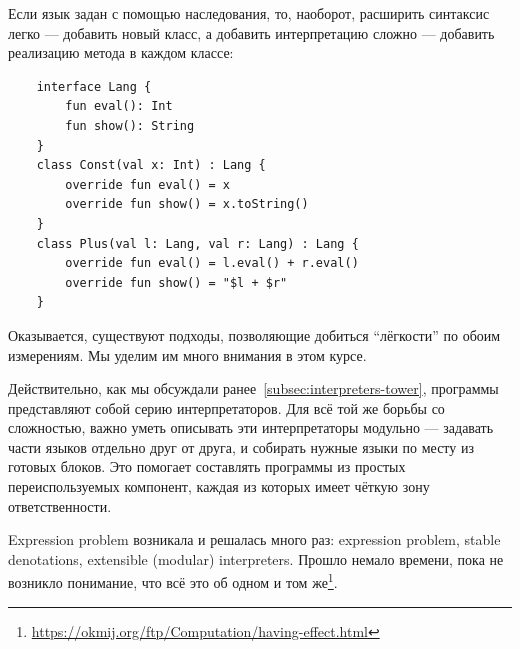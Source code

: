 Если язык задан с помощью наследования, то, наоборот, расширить синтаксис легко --- добавить новый класс, а добавить интерпретацию сложно --- добавить реализацию метода в каждом классе:
\begin{verbatim}
    interface Lang {
        fun eval(): Int
        fun show(): String
    }
    class Const(val x: Int) : Lang {
        override fun eval() = x
        override fun show() = x.toString()
    }
    class Plus(val l: Lang, val r: Lang) : Lang {
        override fun eval() = l.eval() + r.eval()
        override fun show() = "$l + $r"
    }
\end{verbatim}

Оказывается, существуют подходы, позволяющие добиться ``лёгкости'' по обоим измерениям.
Мы уделим им много внимания в этом курсе.

Действительно, как мы обсуждали ранее~\ref{subsec:interpreters-tower}, программы представляют собой серию интерпретаторов.
Для всё той же борьбы со сложностью, важно уметь описывать эти интерпретаторы модульно --- задавать части языков отдельно друг от друга, и собирать нужные языки по месту из готовых блоков.
Это помогает составлять программы из простых переиспользуемых компонент, каждая из которых имеет чёткую зону ответственности.

Expression problem возникала и решалась много раз: expression problem, stable denotations, extensible (modular) interpreters.
Прошло немало времени, пока не возникло понимание, что всё это об одном и том же\footnote{\url{https://okmij.org/ftp/Computation/having-effect.html}}.

